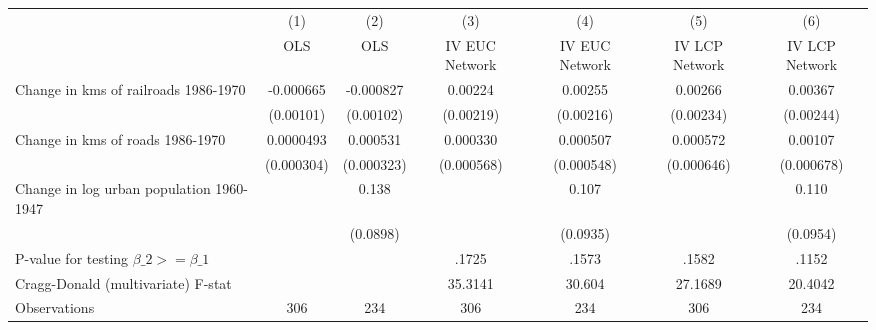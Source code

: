{
\def\sym#1{\ifmmode^{#1}\else\(^{#1}\)\fi}
\begin{tabular}{l*{6}{c}}
\hline\hline
                &\multicolumn{1}{c}{(1)}&\multicolumn{1}{c}{(2)}&\multicolumn{1}{c}{(3)}&\multicolumn{1}{c}{(4)}&\multicolumn{1}{c}{(5)}&\multicolumn{1}{c}{(6)}\\
                &\multicolumn{1}{c}{OLS}&\multicolumn{1}{c}{OLS}&\multicolumn{1}{c}{IV EUC Network}&\multicolumn{1}{c}{IV EUC Network}&\multicolumn{1}{c}{IV LCP Network}&\multicolumn{1}{c}{IV LCP Network}\\
\hline
Change in kms of railroads 1986-1970&-0.000665         &-0.000827         &  0.00224         &  0.00255         &  0.00266         &  0.00367         \\
                &(0.00101)         &(0.00102)         &(0.00219)         &(0.00216)         &(0.00234)         &(0.00244)         \\
[1em]
Change in kms of roads 1986-1970&0.0000493         & 0.000531         & 0.000330         & 0.000507         & 0.000572         &  0.00107         \\
                &(0.000304)         &(0.000323)         &(0.000568)         &(0.000548)         &(0.000646)         &(0.000678)         \\
[1em]
Change in log urban population 1960-1947&                  &    0.138         &                  &    0.107         &                  &    0.110         \\
                &                  & (0.0898)         &                  & (0.0935)         &                  & (0.0954)         \\
\hline
P-value for testing $\beta\_{2} >= \beta\_{1}$&                  &                  &    .1725         &    .1573         &    .1582         &    .1152         \\
Cragg-Donald (multivariate) F-stat&                  &                  &  35.3141         &   30.604         &  27.1689         &  20.4042         \\
Observations    &      306         &      234         &      306         &      234         &      306         &      234         \\
\hline\hline
\end{tabular}
}
